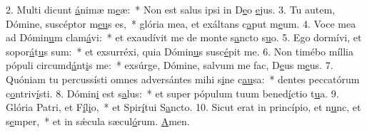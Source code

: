 2. Multi dicunt \uline{á}nimæ m\uline{e}æ:~* Non est salus ipsi in D\uline{e}o \uline{e}jus.
3. Tu autem, Dómine, suscéptor m\uline{e}\uline{u}s es,~* glória mea, et exáltans c\uline{a}put m\uline{e}um.
4. Voce mea ad Dómin\uline{u}m clam\uline{á}vi:~* et exaudívit me de monte s\uline{a}ncto s\uline{u}o.
5. Ego dormívi, et sopor\uline{á}t\uline{u}s sum:~* et exsurréxi, quia Dómin\uline{u}s susc\uline{é}pit me.
6. Non timébo míllia pópuli circumd\uline{á}nt\uline{i}s me:~* exsúrge, Dómine, salvum me fac, D\uline{e}us m\uline{e}us.
7. Quóniam tu percussísti omnes adversántes mihi s\uline{i}ne c\uline{au}sa:~* dentes peccatórum c\uline{o}ntriv\uline{í}sti.
8. Dómin\uline{i} est s\uline{a}lus:~* et super pópulum tuum bened\uline{í}ctio t\uline{u}a.
9. Glória Patri, et F\uline{í}l\uline{i}o,~* et Spir\uline{í}tui S\uline{a}ncto.
10. Sicut erat in princípio, et n\uline{u}nc, et s\uline{e}mper,~* et in sǽcula sæcul\uline{ó}rum. \uline{A}men.
